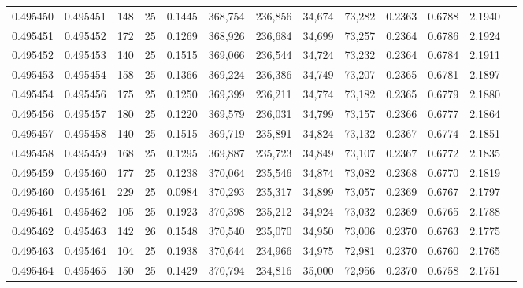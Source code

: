 \begin{tabular}{rrrrrrrrrrrrr}
0.495450 & 0.495451 &   148 &  25 &                                     0.1445 & 368,754 & 236,856 &  34,674 &  73,282 & 0.2363 & 0.6788 & 2.1940 \\
0.495451 & 0.495452 &   172 &  25 &                                     0.1269 & 368,926 & 236,684 &  34,699 &  73,257 & 0.2364 & 0.6786 & 2.1924 \\
0.495452 & 0.495453 &   140 &  25 &                                     0.1515 & 369,066 & 236,544 &  34,724 &  73,232 & 0.2364 & 0.6784 & 2.1911 \\
0.495453 & 0.495454 &   158 &  25 &                                     0.1366 & 369,224 & 236,386 &  34,749 &  73,207 & 0.2365 & 0.6781 & 2.1897 \\
0.495454 & 0.495456 &   175 &  25 &                                     0.1250 & 369,399 & 236,211 &  34,774 &  73,182 & 0.2365 & 0.6779 & 2.1880 \\
0.495456 & 0.495457 &   180 &  25 &                                     0.1220 & 369,579 & 236,031 &  34,799 &  73,157 & 0.2366 & 0.6777 & 2.1864 \\
0.495457 & 0.495458 &   140 &  25 &                                     0.1515 & 369,719 & 235,891 &  34,824 &  73,132 & 0.2367 & 0.6774 & 2.1851 \\
0.495458 & 0.495459 &   168 &  25 &                                     0.1295 & 369,887 & 235,723 &  34,849 &  73,107 & 0.2367 & 0.6772 & 2.1835 \\
0.495459 & 0.495460 &   177 &  25 &                                     0.1238 & 370,064 & 235,546 &  34,874 &  73,082 & 0.2368 & 0.6770 & 2.1819 \\
0.495460 & 0.495461 &   229 &  25 &                                     0.0984 & 370,293 & 235,317 &  34,899 &  73,057 & 0.2369 & 0.6767 & 2.1797 \\
0.495461 & 0.495462 &   105 &  25 &                                     0.1923 & 370,398 & 235,212 &  34,924 &  73,032 & 0.2369 & 0.6765 & 2.1788 \\
0.495462 & 0.495463 &   142 &  26 &                                     0.1548 & 370,540 & 235,070 &  34,950 &  73,006 & 0.2370 & 0.6763 & 2.1775 \\
0.495463 & 0.495464 &   104 &  25 &                                     0.1938 & 370,644 & 234,966 &  34,975 &  72,981 & 0.2370 & 0.6760 & 2.1765 \\
0.495464 & 0.495465 &   150 &  25 &                                     0.1429 & 370,794 & 234,816 &  35,000 &  72,956 & 0.2370 & 0.6758 & 2.1751 \\

\end{tabular}
